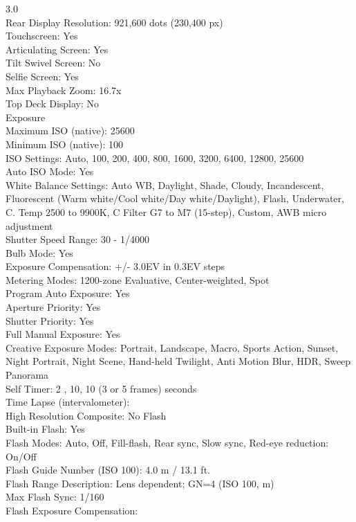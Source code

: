 \documentclass[12pt]{report}
\begin{document}
3.0
\\Rear Display Resolution:
921,600 dots (230,400 px) 
\\Touchscreen:
Yes
\\Articulating Screen:
Yes
\\Tilt Swivel Screen:
No
\\Selfie Screen:
Yes
\\Max Playback Zoom:
16.7x
\\Top Deck Display:
No
\\Exposure
\\Maximum ISO (native):
25600
\\Minimum ISO (native):
100
\\ISO Settings:
Auto, 100, 200, 400, 800, 1600, 3200, 6400, 12800, 25600
\\Auto ISO Mode:
Yes
\\White Balance Settings:
Auto WB, Daylight, Shade, Cloudy, Incandescent, Fluorescent (Warm white/Cool white/Day white/Daylight), Flash, Underwater, C. Temp 2500 to 9900K, C Filter G7 to M7 (15-step), Custom, AWB micro adjustment
\\Shutter Speed Range:
30 - 1/4000
\\Bulb Mode:
Yes
\\Exposure Compensation:
+/- 3.0EV in 0.3EV steps 
\\Metering Modes:
1200-zone Evaluative, Center-weighted, Spot
\\Program Auto Exposure:
Yes
\\Aperture Priority:
Yes
\\Shutter Priority:
Yes
\\Full Manual Exposure:
Yes
\\Creative Exposure Modes:
Portrait, Landscape, Macro, Sports Action, Sunset, Night Portrait, Night Scene, Hand-held Twilight, Anti Motion Blur, HDR, Sweep Panorama
\\Self Timer:
2 , 10, 10 (3 or 5 frames) seconds
\\Time Lapse (intervalometer):
\\High Resolution Composite:
No
Flash
\\Built-in Flash:
Yes
\\Flash Modes:
Auto, Off, Fill-flash, Rear sync, Slow sync, Red-eye reduction: On/Off
\\Flash Guide Number (ISO 100):
4.0 m / 13.1 ft. 
\\Flash Range Description:
Lens dependent; GN=4 (ISO 100, m)
\\Max Flash Sync:
1/160
\\Flash Exposure Compensation:
\end{document}
